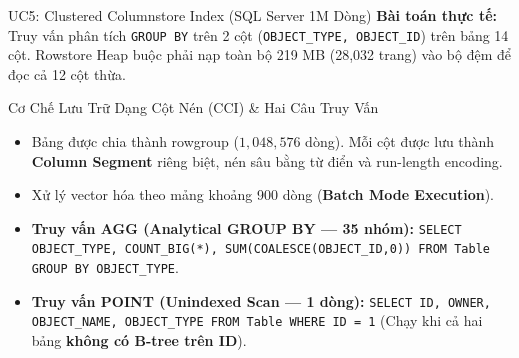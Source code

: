 \documentclass[aspectratio=169,9pt]{beamer}
\begin{document}
\begin{frame}{UC5: Clustered Columnstore Index (SQL Server 1M Dòng)}
\textbf{Bài toán thực tế:} Truy vấn phân tích \texttt{GROUP BY} trên 2 cột (\texttt{OBJECT\_TYPE, OBJECT\_ID}) trên bảng 14 cột. Rowstore Heap buộc phải nạp toàn bộ 219 MB (28,032 trang) vào bộ đệm để đọc cả 12 cột thừa.

\begin{block}{Cơ Chế Lưu Trữ Dạng Cột Nén (CCI) \& Hai Câu Truy Vấn}
\begin{itemize}
  \item Bảng được chia thành rowgroup ($1,048,576$ dòng). Mỗi cột được lưu thành \textbf{Column Segment} riêng biệt, nén sâu bằng từ điển và run-length encoding.
  \item Xử lý vector hóa theo mảng khoảng 900 dòng (\textbf{Batch Mode Execution}).
  \item \textbf{Truy vấn AGG (Analytical GROUP BY --- 35 nhóm):} \texttt{SELECT OBJECT\_TYPE, COUNT\_BIG(*), SUM(COALESCE(OBJECT\_ID,0)) FROM Table GROUP BY OBJECT\_TYPE}.
  \item \textbf{Truy vấn POINT (Unindexed Scan --- 1 dòng):} \texttt{SELECT ID, OWNER, OBJECT\_NAME, OBJECT\_TYPE FROM Table WHERE ID = 1} (Chạy khi cả hai bảng \textbf{không có B-tree trên ID}).
\end{itemize}
\end{block}
\end{frame}
\end{document}

